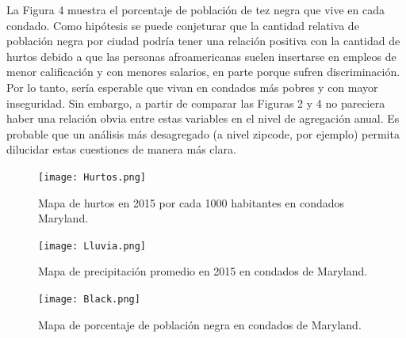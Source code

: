 \documentclass[10.5pt]{article}   %
\begin{document}
La Figura 4 muestra el porcentaje de población de tez negra que vive en cada condado. Como hipótesis se puede conjeturar que la cantidad relativa de población negra por ciudad podría tener una relación positiva con la cantidad de hurtos debido a que las personas afroamericanas suelen insertarse en empleos de menor calificación y con menores salarios, en parte porque sufren discriminación. Por lo tanto, sería esperable que vivan en condados más pobres y con mayor inseguridad. Sin embargo, a partir de comparar las Figuras 2 y 4 no pareciera haber una relación obvia entre estas variables en el nivel de agregación anual. Es probable que un análisis más desagregado (a nivel zipcode, por ejemplo) permita dilucidar estas cuestiones de manera más clara. 



\begin{landscape}
\begin{figure}[H]
\centering
    \centering
    \texttt{[image: Hurtos.png]}
    \label{fig2}
\caption{Mapa de hurtos en 2015 por cada 1000 habitantes en condados Maryland.}
\end{figure}
\end{landscape}

\begin{landscape}
\begin{figure}[H]
\centering
    \centering
    \texttt{[image: Lluvia.png]}
    \label{fig2}
\caption{Mapa de precipitación promedio en 2015 en condados de Maryland.}
\end{figure}
\end{landscape}

\begin{landscape}
\begin{figure}[H]
\centering
    \centering
    \texttt{[image: Black.png]}
    \label{fig2}
\caption{Mapa de porcentaje de población negra en condados de Maryland.}
\end{figure}
\end{landscape}
\end{document}
